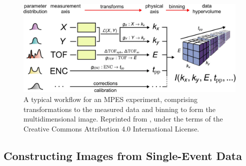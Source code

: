 \begin{figure}[h]
    \centering
    \includegraphics[width=1\linewidth]{images/41597_2020_769_Fig2_HTML.png}
    \caption{A typical workflow for an \gls{MPES} experiment, comprising transformations to the measured data and binning to form the multidimensional image. Reprinted from \cite{xianOpensourceEndtoendWorkflow2020}, under the terms of the Creative Commons Attribution 4.0 International License.}
    \label{fig:mpes_workflow}
\end{figure}

\subsection{Constructing Images from Single-Event Data}

